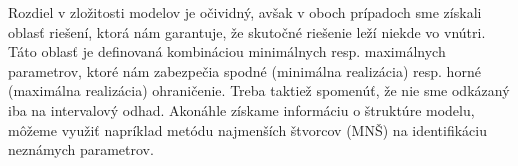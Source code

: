 Rozdiel v zložitosti modelov je očividný, avšak v oboch prípadoch sme získali oblasť riešení, ktorá nám garantuje, že skutočné riešenie leží niekde vo vnútri. Táto oblasť je definovaná kombináciou minimálnych resp. maximálnych parametrov, ktoré nám zabezpečia spodné (minimálna realizácia) resp. horné (maximálna realizácia) ohraničenie. Treba taktiež spomenúť, že nie sme odkázaný iba na intervalový odhad. Akonáhle získame informáciu o štruktúre modelu, môžeme využiť napríklad metódu najmenších štvorcov (MNŠ) na identifikáciu neznámych parametrov. 
